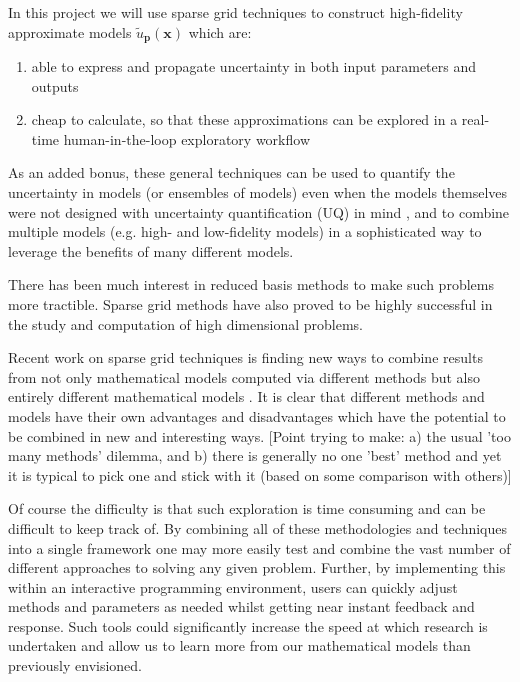 \documentclass[a4paper,fontsize=12pt]{scrartcl}
\begin{document}

In this project we will use sparse grid techniques to construct
high-fidelity approximate models $\tilde{u}_{\mathbf{p}}(\mathbf{x})$
which are:
\begin{enumerate}
\item able to express and propagate uncertainty in both input
  parameters and outputs
\item cheap to calculate, so that these approximations can be explored
  in a real-time human-in-the-loop exploratory workflow
\end{enumerate}
As an added bonus, these general techniques can be used to quantify
the uncertainty in models (or ensembles of models) even when the
models themselves were not designed with uncertainty quantification
(UQ) in mind , and to combine multiple models (e.g. high- and low-fidelity
models) in a sophisticated way to leverage the benefits of many
different models.

There has been much interest in reduced basis methods to make such
problems more tractible. Sparse grid methods
have also proved to be highly successful in the study and computation
of high dimensional problems.

Recent work on sparse grid techniques is finding new ways to
combine results from not only mathematical models computed via
different methods  but also entirely different mathematical
models . It is clear that different methods and models
have their own advantages and disadvantages which have the potential
to be combined in new and interesting ways. [Point trying to make: a)
the usual 'too many methods' dilemma, and b) there is generally no one
'best' method and yet it is typical to pick one and stick with it
(based on some comparison with others)]

Of course the difficulty is that such exploration is time consuming
and can be difficult to keep track of. By combining all of these
methodologies and techniques into a single framework one may more
easily test and combine the vast number of different approaches to
solving any given problem. Further, by implementing this within an
interactive programming environment, users can quickly adjust methods
and parameters as needed whilst getting near instant feedback and
response. Such tools could significantly increase the speed at which
research is undertaken and allow us to learn more from our
mathematical models than previously envisioned.
\end{document}
